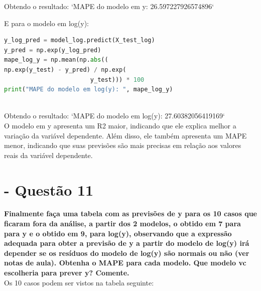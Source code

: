 \documentclass[a4paper, 12pt]{article}
\begin{document}
Obtendo o resultado: `MAPE do modelo em y:  26.597227926574896`

E para o modelo em log(y):\\

\begin{tcolorbox}[colback=white,boxrule=1pt,arc=5pt,auto outer arc]
  \begin{lstlisting}[language=Python]
y_log_pred = model_log.predict(X_test_log)
y_pred = np.exp(y_log_pred)
mape_log_y = np.mean(np.abs((
np.exp(y_test) - y_pred) / np.exp(
                        y_test))) * 100
print("MAPE do modelo em log(y): ", mape_log_y)
    \end{lstlisting}
\end{tcolorbox} \\


Obtendo o resultado: `MAPE do modelo em log(y): 27.60382056419169` \\

O modelo em y apresenta um R2 maior, indicando que ele explica melhor a variação da variável dependente. Além disso, ele também apresenta um MAPE menor, indicando que suas previsões são mais precisas em relação aos valores reais da variável dependente.\\














\section{- Questão 11}
\textbf{Finalmente faça uma tabela com as previsões de y para os 10 casos que ficaram fora da
análise, a partir dos 2 modelos, o obtido em 7 para para y e o obtido em 9, para log(y),
observando que a expressão adequada para obter a previsão de y a partir do modelo de
log(y) irá depender se os resíduos do modelo de log(y) são normais ou não (ver notas de
aula). Obtenha o MAPE para cada modelo. Que modelo vc escolheria para prever y? Comente.} \\

Os 10 casos podem ser vistos na tabela seguinte:\\
\end{document}
